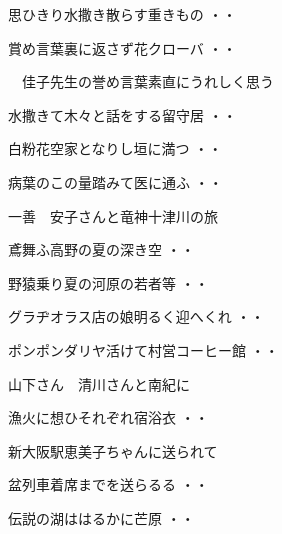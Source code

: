 \begin{shiika}思ひきり水撒き散らす重きもの
\hfill{・・}\end{shiika}
\begin{shiika}賞め言葉裏に返さず花クローバ
\hfill{・・}\end{shiika}
\qquad\qquad　佳子先生の誉め言葉素直にうれしく思う
\vspace{0.6cm}
\begin{shiika}水撒きて木々と話をする留守居
\hfill{・・}\end{shiika}
\begin{shiika}白粉花空家となりし垣に満つ
\hfill{・・}\end{shiika}
\begin{shiika}病葉のこの量踏みて医に通ふ
\hfill{・・}\end{shiika}
\vspace{0.6cm}
一善　安子さんと竜神十津川の旅
\begin{shiika}鳶舞ふ高野の夏の深き空
\hfill{・・}\end{shiika}
\vspace{0.6cm}
\begin{shiika}野猿乗り夏の河原の若者等
\hfill{・・}\end{shiika}
\vspace{0.6cm}
\begin{shiika}グラヂオラス店の娘明るく迎へくれ
\hfill{・・}\end{shiika}
\vspace{0.6cm}
\begin{shiika}ポンポンダリヤ活けて村営コーヒー館
\hfill{・・}\end{shiika}
\vspace{0.6cm}
山下さん　清川さんと南紀に
\begin{shiika}漁火に想ひそれぞれ宿浴衣
\hfill{・・}\end{shiika}
\vspace{0.6cm}
新大阪駅恵美子ちゃんに送られて
\begin{shiika}盆列車着席までを送らるる
\hfill{・・}\end{shiika}
\vspace{0.6cm}
\begin{shiika}伝説の湖ははるかに芒原
\hfill{・・}\end{shiika}

